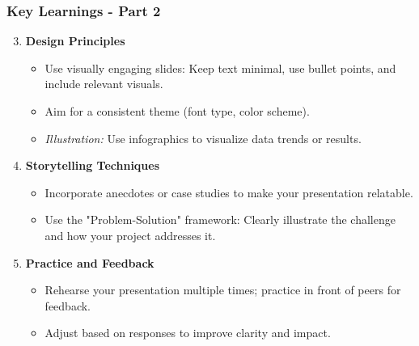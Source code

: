 \documentclass[aspectratio=169]{beamer}
\begin{document}
\begin{frame}[fragile]
    \frametitle{Key Learnings - Part 2}

    \begin{enumerate}
        \setcounter{enumi}{2} %

        \item \textbf{Design Principles}
        \begin{itemize}
            \item Use visually engaging slides: Keep text minimal, use bullet points, and include relevant visuals.
            \item Aim for a consistent theme (font type, color scheme).
            \item \textit{Illustration:} Use infographics to visualize data trends or results.
        \end{itemize}

        \item \textbf{Storytelling Techniques}
        \begin{itemize}
            \item Incorporate anecdotes or case studies to make your presentation relatable.
            \item Use the "Problem-Solution" framework: Clearly illustrate the challenge and how your project addresses it.
        \end{itemize}

        \item \textbf{Practice and Feedback}
        \begin{itemize}
            \item Rehearse your presentation multiple times; practice in front of peers for feedback.
            \item Adjust based on responses to improve clarity and impact.
        \end{itemize}
    \end{enumerate}
\end{frame}
\end{document}
